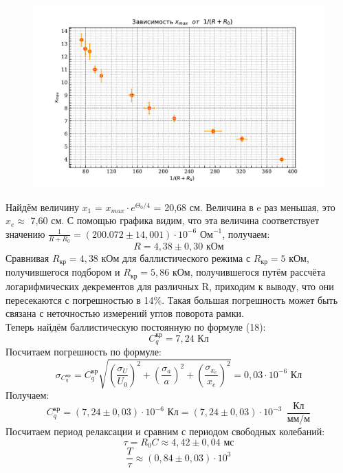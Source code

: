 \documentclass[a4paper,12pt]{article} %
\begin{document}
\begin{figure}[h!]
    \centering
    \includegraphics[width=1\linewidth]{graph3_data_2.pdf}
    \label{fig:enter-label}
\end{figure}
Найдём величину $x_1$ = $x_{max} \cdot  e^{\Theta_0/4} $ = 20,68 см. Величина в $\text{e}$ раз меньшая, это $x_e \approx$ 7,60 см. С помощью графика видим, что эта величина соответствует значению $\frac{1}{R+R_0} = (200.072 \pm 14,001)\cdot 10^{-6}\text{ Ом}^{-1}$, получаем:
\[
R   = 4,38 \pm 0,30 \text{ кОм} 
\]
Сравнивая $R_\text{кр} = 4,38 \text{ кОм}$  для баллистического режима с $R_\text{кр} = 5 \text{ кОм}$, получившегося подбором и $R_\text{кр} = 5,86 \text{ кОм}$, получившегося путём рассчёта логарифмических декрементов для различных R, приходим к выводу, что они пересекаются с погрешностью в 14\%. Такая большая погрешность может быть связана с неточностью измерений углов поворота рамки.
\\
Теперь найдём баллистическую постоянную по формуле (18):
\[
C_q^{\text{кр}} = 7,24 \text{ Кл}
\]
Посчитаем погрешность по формуле:
\[
\sigma_{C^{\text{кр}}_q} = C^{\text{кр}}_q \sqrt{\left(\frac{\sigma_U}{U_0}\right)^2 + \left(\frac{\sigma_a}{a}\right)^2+\left(\frac{\sigma_{x_e}}{x_e}\right)^2} = 0,03 \cdot 10^{-6} \text{ Кл} 
\]
Получаем:
\[
 C^{\text{кр}}_q = (7,24 \pm 0,03) \cdot 10^{-6} \text{ Кл} = (7,24 \pm 0,03) \cdot 10^{-3} \ \ \frac{\text{Кл}}{\text{мм/м}}
\]
Посчитаем период релаксации и сравним с периодом свободных колебаний:
\[
\tau = R_0 C \approx 4,42 \pm 0,04\text{ мс}
\]
\[
\frac{T}{\tau} \approx (0,84 \pm 0,03) \cdot 10^3 
\]
\end{document}

